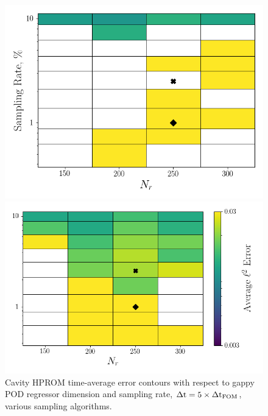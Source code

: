 \begin{figure}
	\begin{minipage}{0.46\linewidth}
		\includegraphics[width=0.99\linewidth]{Chapters/CavityAndCVRC/Images/cavity/deim/err_contour_gnat1_dt5e-6.png}
	\end{minipage}
	\begin{minipage}{0.53\linewidth}
		\includegraphics[width=0.99\linewidth]{Chapters/CavityAndCVRC/Images/cavity/deim/err_contour_gnat2_dt5e-6.png}
	\end{minipage}
	\caption{\label{fig:cavitySampledROMErrContour}Cavity HPROM time-average error contours with respect to gappy POD regressor dimension and sampling rate, $\Delta \text{t} = 5 \times \Delta \text{t}_{\text{FOM}}$, various sampling algorithms.}
\end{figure}

